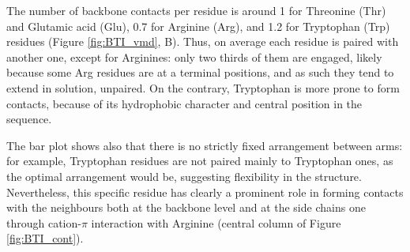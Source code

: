 The number of backbone contacts per residue is around 1 for Threonine (Thr) and Glutamic acid (Glu), 0.7 for Arginine (Arg), and 1.2 for Tryptophan (Trp) residues (Figure \ref{fig:BTI_vmd}, B).
%
Thus, on average each residue is paired with another one, except for Arginines: only two thirds of them are engaged, likely because some Arg residues are at a terminal positions, and as such they tend to extend in solution, unpaired. On the contrary, Tryptophan is more prone to form contacts, because of its hydrophobic character and central position in the sequence.

The bar plot shows also that there is no strictly fixed arrangement between arms: for example, Tryptophan residues are not paired mainly to Tryptophan ones, as the optimal arrangement would be, suggesting flexibility in the structure.
%
Nevertheless, this specific residue has clearly a prominent role in forming contacts with the neighbours both at the backbone level and at the side chains one through cation-$\pi$ interaction with Arginine (central column of Figure \ref{fig:BTI_cont}).


